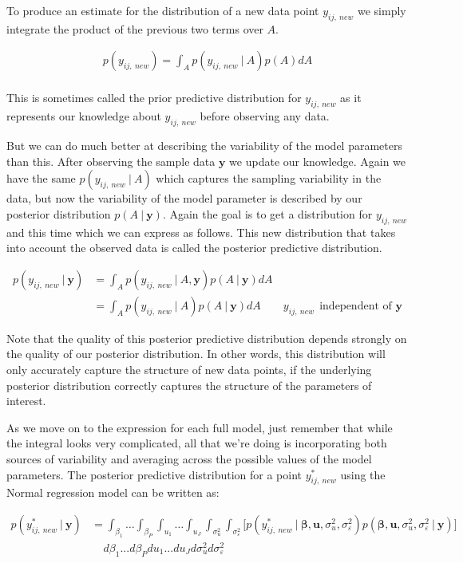 \documentclass[12pt,twoside]{reedthesis}
\begin{document}
To produce an estimate for the distribution of a new data point \(y_{ij, \ new}\) we simply integrate the product of the previous two terms over \(A\).

\[
\begin{aligned}
 p(y_{ij, \ new}) = \int_A p(y_{ij, \ new} \ | \ A)p(A )dA   \\
\end{aligned}
\]

This is sometimes called the prior predictive distribution for \(y_{ij, \ new}\) as it represents our knowledge about \(y_{ij, \ new}\) before observing any data.

But we can do much better at describing the variability of the model parameters than this. After observing the sample data \(\mathbf{y}\) we update our knowledge. Again we have the same \(p(y_{ij, \ new} \ | \ A)\) which captures the sampling variability in the data, but now the variability of the model parameter is described by our posterior distribution \(p(A \ | \ \mathbf{y})\). Again the goal is to get a distribution for \(y_{ij, \ new}\) and this time which we can express as follows. This new distribution that takes into account the observed data is called the posterior predictive distribution.

\[
\begin{aligned}
p(y_{ij,\ new} \ | \ \mathbf{y}) &= 
\int_A p(y_{ij, \ new} \ | \ A, \mathbf{y})p(A \ | \ \mathbf{y})dA \\ &=  \int_A p(y_{ij, \ new} \ | \ A)p(A \ | \ \mathbf{y})dA \qquad y_{ij, \ new} \ \  \text{independent of } \mathbf{y} 
\end{aligned}
\]

Note that the quality of this posterior predictive distribution depends strongly on the quality of our posterior distribution. In other words, this distribution will only accurately capture the structure of new data points, if the underlying posterior distribution correctly captures the structure of the parameters of interest.

As we move on to the expression for each full model, just remember that while the integral looks very complicated, all that we're doing is incorporating both sources of variability and averaging across the possible values of the model parameters. The posterior predictive distribution for a point \(y^*_{ij, \ new}\) using the Normal regression model can be written as:

\[
\begin{aligned}
p(y^*_{ij, \ new} \ | \ \mathbf{y}) &=  \int_{\beta_1}  \dots \int_{\beta_P} \int_{u_1} \dots \int_{u_J} \int_{\sigma_{u}^2} \int_{\sigma_{\varepsilon}^2} \bigg[p(y^*_{ij, \ new} \ | \ \boldsymbol{\beta}, \boldsymbol{u}, \sigma_{u}^2, \sigma_{\varepsilon}^2)p(\boldsymbol{\beta}, \mathbf{u}, \sigma_{u}^2, \sigma_{\varepsilon}^2 \ | \ \mathbf{y})\bigg] \\
& \ \ \ \ \ d\beta_1 ...  d\beta_Pdu_1...du_Jd\sigma_{u}^2d\sigma_{\varepsilon}^2
\end{aligned}
\]
\end{document}
